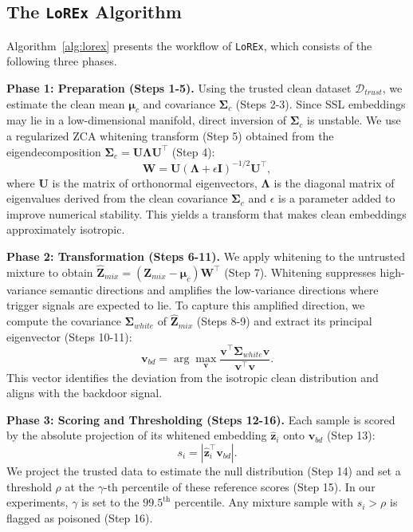 \documentclass[letterpaper,twocolumn,10pt]{article}
\begin{document}
 
\subsection{The \texttt{LoREx} Algorithm}

\par Algorithm~\ref{alg:lorex} presents the workflow of \texttt{LoREx}, which consists of the following three phases. 
\par \textbf{Phase 1: Preparation (Steps 1-5).}
Using the trusted clean dataset $\mathcal{D}_{trust}$, we estimate the clean mean $\bm{\mu}_c$ and covariance $\bm{\Sigma}_c$ (Steps 2-3). Since SSL embeddings may lie in a low-dimensional manifold, direct inversion of $\bm{\Sigma}_c$ is unstable. We use a regularized ZCA whitening transform (Step 5) obtained from the eigendecomposition $\bm{\Sigma}_c = \mathbf{U} \bm{\Lambda} \mathbf{U}^\top$ (Step 4):
\begin{equation}
    \mathbf{W} = \mathbf{U}(\bm{\Lambda} + \epsilon \mathbf{I})^{-1/2} \mathbf{U}^\top,
\end{equation}
where $\mathbf{U}$ is the matrix of orthonormal eigenvectors, $\bm{\Lambda}$ is the diagonal matrix of eigenvalues derived from the clean covariance $\bm{\Sigma}_c$ and $\epsilon$ is a parameter added to improve numerical stability. This yields a transform that makes clean embeddings approximately isotropic.

\par \textbf{Phase 2: Transformation (Steps 6-11).}
We apply whitening to the untrusted mixture to obtain $\mathbf{\hat{Z}}_{mix} = (\mathbf{Z}_{mix} - \bm{\mu}_c) \mathbf{W}^\top$ (Step 7). Whitening suppresses high-variance semantic directions and amplifies the low-variance directions where trigger signals are expected to lie. To capture this amplified direction, we compute the covariance $\bm{\Sigma}_{white}$ of $\mathbf{\hat{Z}}_{mix}$ (Steps 8-9) and extract its principal eigenvector (Steps 10-11):
\begin{equation}
    \mathbf{v}_{bd} = \arg\max_{\mathbf{v}} \frac{\mathbf{v}^\top \bm{\Sigma}_{white} \mathbf{v}}{\mathbf{v}^\top \mathbf{v}}.
\end{equation}
This vector identifies the deviation from the isotropic clean distribution and aligns with the backdoor signal.

\par \textbf{Phase 3: Scoring and Thresholding (Steps 12-16).}
Each sample is scored by the absolute projection of its whitened embedding $\hat{\mathbf{z}}_i$ onto $\mathbf{v}_{bd}$ (Step 13):
\begin{equation}
    s_i = |\hat{\mathbf{z}}_i^\top \mathbf{v}_{bd}|.
\end{equation}
We project the trusted data to estimate the null distribution (Step 14) and set a threshold $\rho$ at the $\gamma$-th percentile of these reference scores (Step 15). In our experiments, $\gamma$ is set to the $99.5^{\text{th}}$ percentile. Any mixture sample with $s_i > \rho$ is flagged as poisoned (Step 16).
\end{document}
